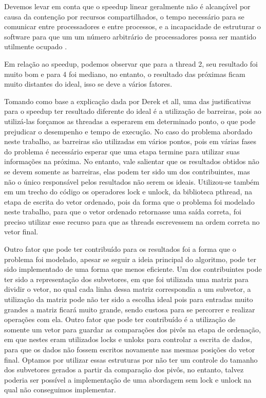 \documentclass[journal]{IEEEtran}
\begin{document}
 
Devemos levar em conta que o speedup linear geralmente não é alcançável por causa da contenção por recursos compartilhados, o tempo necessário para se comunicar entre processadores e entre processos, e a incapacidade de estruturar o software para que um um número arbitrário de processadores possa ser mantido utilmente ocupado \cite{Eager}.

Em relação ao speedup, podemos observar que para a thread 2, seu resultado foi muito bom e para 4 foi mediano, no entanto, o resultado das próximas ficam muito distantes do ideal, isso se deve a vários fatores. 

 Tomando como base a explicação dada por Derek et all, uma das justificativas para o speedup ter resultado diferente do ideal é a utilização de barreiras, pois ao utilizá-las forçamos as threadas a esperarem em determinado ponto, o que pode prejudicar o desempenho e tempo de execução. No caso do problema abordado neste trabalho, as barreiras são utilizadas em vários pontos, pois em várias fases do problema é necessário esperar que uma etapa termine para utilizar suas informações na próxima. No entanto, vale salientar que os resultados obtidos não se devem somente as barreiras, elas podem ter sido um dos contribuintes, mas não o único responsável pelos resultados não serem os ideais. Utilizou-se também em um trecho do código os operadores lock e unlock, da biblioteca pthread, na etapa de escrita do vetor ordenado, pois da forma que o problema foi modelado neste trabalho, para que o vetor ordenado retornasse uma saída correta, foi preciso utilizar esse recurso para que as threads escrevessem na ordem correta no vetor final.
 
 Outro fator que pode ter contribuído para os resultados foi a forma que o problema foi modelado, apesar se seguir a ideia principal do algoritmo, pode ter sido implementado de uma forma que menos eficiente. Um dos contribuintes pode ter sido a representação dos subvetores, em que foi utilizada uma matriz para dividir o vetor, no qual cada linha dessa matriz correspondia a um subvetor, a utilização da matriz pode não ter sido a escolha ideal pois para entradas muito grandes a matriz ficará muito grande, sendo custosa para se percorrer e realizar operações com ela. Outro fator que pode ter contribuído é a utilização de somente um vetor para guardar as comparações dos pivôs na etapa de ordenação, em que nestes eram utilizados locks e unloks para controlar a escrita de dados, para que os dados não fossem escritos novamente nas mesmas posições do vetor final. Optamos por utilizar essas estruturas por não ter um controle do tamanho dos subvetores gerados a partir da comparação dos pivôs, no entanto, talvez poderia ser possível a implementação de uma abordagem sem lock e unlock na qual não conseguimos implementar. 
 
\end{document}
